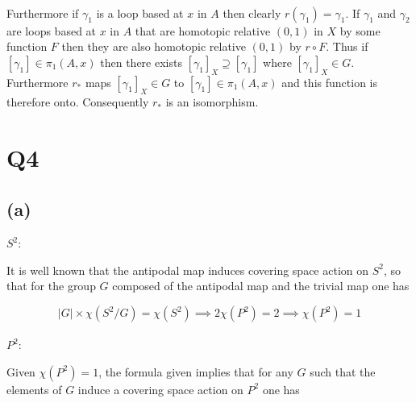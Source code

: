 \documentclass{article}
\begin{document}
\paragraph{}
Furthermore if $\gamma_1$ is a loop based at $x$ in $A$ then clearly $r(\gamma_1) = \gamma_1$. If 
$\gamma_1$ and $\gamma_2$ are loops based at $x$ in $A$ that are homotopic relative $(0,1)$ 
in $X$ by some function $F$ then they are also homotopic relative $(0,1)$ by $r\circ F$. 
Thus if $[\gamma_1] \in \pi_1(A,x)$ then there exists $[\gamma_1]_X \supseteq [\gamma_1]$ where 
$[\gamma_1]_X \in G$. Furthermore $r_*$ maps $[\gamma_1]_X \in G$ to $[\gamma_1] \in \pi_1(A,x)$ and this function is therefore onto.
Consequently $r_*$ is an isomorphism.


\section*{Q4}
\subsection*{(a)}
\paragraph{$S^2:$}
It is well known that the antipodal map induces covering space action on $S^2$, so that for the group $G$
composed of the antipodal map and the trivial map one has 

\begin{equation*}
    |G|\times \chi(S^2/G) = \chi(S^2) \implies 2\chi(P^2) = 2 \implies \chi(P^2) = 1
\end{equation*}

\paragraph{$P^2:$}
Given $\chi(P^2) = 1$, the formula given implies that for any $G$ such that the elements of 
$G$ induce a covering space action on $P^2$ one has 
\end{document}
